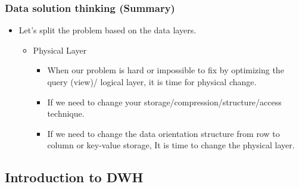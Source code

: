 \begin{frame}
  \frametitle{Data solution thinking (Summary) }
  \begin{itemize}[<+->]
  \item Let's split the problem based on the data layers.
    \begin{itemize}[<+->]
    \item Physical Layer
      \begin{itemize}[<+->]
      \item When our problem is hard or impossible to fix by optimizing the query (view)/ logical layer, it is time for physical change.
      \item If we need to change your storage/compression/structure/access technique.
      \item If we need to change the data orientation structure from row to column or key-value storage, It is time to change the physical layer.
      \end{itemize}
    \end{itemize}
  \end{itemize}
 \end{frame}

\subsection{Introduction to DWH}

